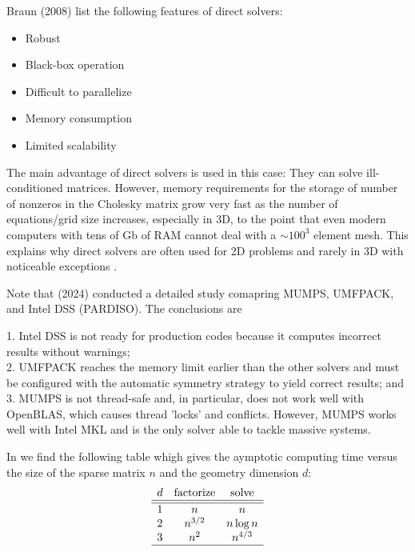 Braun \etal (2008) \cite{brtf08} list the following features of direct solvers:
\begin{itemize}
\item Robust
\item Black-box operation
\item Difficult to parallelize
\item Memory consumption
\item Limited scalability
\end{itemize}

The main advantage of direct solvers is used in this case: They can solve ill-conditioned 
matrices. However, memory requirements for the storage of number of nonzeros in the 
Cholesky matrix grow very fast as the number of equations/grid size increases, especially in 3D,
to the point that even modern computers with tens of Gb of RAM cannot deal with a $\sim 100^3$ element mesh.
This explains why direct solvers are often used for 2D problems and rarely in 3D with noticeable 
exceptions \cite{thfb08,yahb09,brya10,lobh10,alht11,alht12,alhf13,whbb14,neew18}. 

Note that \textcite{pedr24} (2024) conducted a detailed study comapring 
MUMPS, UMFPACK, and Intel DSS (PARDISO).
The conclusions are 
\begin{displayquote}
{\color{darkgray}
1. Intel DSS is not ready for production codes because it computes incorrect results without warnings;\\
2. UMFPACK reaches the memory limit earlier than the other solvers and must be configured with the automatic
symmetry strategy to yield correct results; and\\
3. MUMPS is not thread-safe and, in particular, does not work well with OpenBLAS, which causes thread 'locks' and
conflicts. However, MUMPS works well with Intel MKL and is the only solver able to tackle massive systems.}
\end{displayquote}
In \textcite{saramito} we find the following table whigh gives the aymptotic computing time versus the 
size of the sparse matrix $n$ and the geometry dimension $d$:
\[
\begin{array}{lcc}
d& \text{factorize} & \text{solve} \\
\hline\hline
1& n & n \\
2& n^{3/2} & n \log n \\
3& n^2 & n^{4/3}\\
\hline
\end{array}
\]

